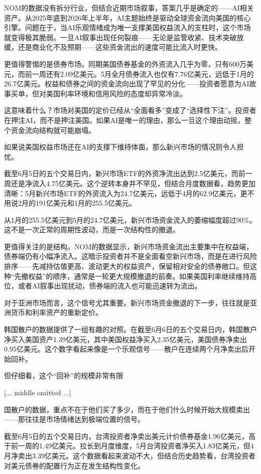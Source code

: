 \documentclass[11pt]{ctexart}
\begin{document}
NOM的数据没有拆分行业，但结合近期市场叙事，答案几乎是确定的——AI相关资产。从2025年底到2026年上半年，AI主题始终是驱动全球资金流向美国的核心引擎。问题在于，当AI乐观情绪成为唯一支撑美国权益流入的支柱时，这个市场就变得极其脆弱。一旦AI叙事出现任何裂痕——无论是监管收紧、技术突破放缓，还是商业化不及预期——这些资金流出的速度可能比流入时更快。

更值得警惕的是债券市场。同期美国债券基金的外资流入几乎为零，只有600万美元，而前一周还有2.09亿美元。5月全月债券流入也仅有7.76亿美元，远低于1月的26.7亿美元。权益和债券之间的资金流向出现了罕见的分化——投资者愿意为AI故事买单，但对美国利率环境和信用风险的态度却异常冷淡。

这意味着什么？市场对美国的定价已经从“全面看多”变成了“选择性下注”。投资者在押注AI，而不是押注美国。如果AI是唯一的理由，那么一旦这个理由动摇，整个资金流向结构就可能崩塌。

如果说美国权益市场还在AI的支撑下维持体面，那么新兴市场的情况则令人担忧。

截至6月5日的五个交易日内，新兴市场ETF的外资净流出达到2.5亿美元，而前一周还是净流入4.75亿美元。这个逆转本身并不罕见，但结合月度数据看，趋势更加清晰：5月新兴市场ETF的外资流入为24.7亿美元，远低于4月的62.9亿美元，更不用说2月的191亿美元和1月的255.5亿美元。

从1月的255.5亿美元到5月的24.7亿美元，新兴市场资金流入的萎缩幅度超过90\%。这不是一次正常的周期性波动，而是一次结构性的撤退。

更值得关注的是结构。NOM的数据显示，新兴市场资金流出主要集中在权益端，债券端仍有小幅净流入。这暗示投资者并不是全面看空新兴市场，而是在进行风险排序——先减持估值更高、波动更大的权益资产，保留相对安全的债券敞口。但这种“先撤权益”的顺序，通常是一轮更大规模撤退的前奏。如果美国利率继续维持高位，或者AI叙事出现扰动，债券端的流入也可能迅速转为流出。

对于亚洲市场而言，这个信号尤其重要。新兴市场资金撤退的下一步，往往就是亚洲货币和利率资产的重新定价。

韩国散户的数据提供了一组有趣的对照。在截至6月6日的五个交易日内，韩国散户净买入美国资产1.39亿美元，其中美国权益净买入2.35亿美元，美国债券净卖出0.95亿美元。这个数字看起来像是一个乐观信号——散户在连续两个月净卖出后开始回补。

但仔细看，这个“回补”的规模非常有限

[... middle omitted ...]

国散户的数据，重点不在于他们买了多少，而在于他们什么时候开始大规模卖出——那往往是市场情绪达到极端位置的信号。

截至6月5日的五个交易日内，台湾投资者净卖出美元计价债券基金1.96亿美元，高于前一周的1.49亿美元。拉长到月度维度，5月台湾投资者净买入1.83亿美元，但4月净卖出3.39亿美元。这个数据看起来波动不大，但结合历史趋势看，台湾投资者对美元债券的配置行为正在发生结构性变化。
\end{document}
